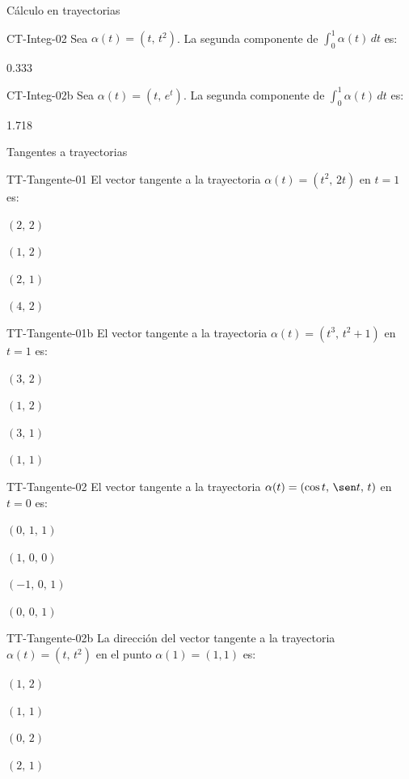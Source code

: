 \documentclass[a4,11pt]{aleph-notas}
\begin{document}
\begin{quiz}{Cálculo en trayectorias}
\begin{numerical}[tolerance=0.01]%
    {CT-Integ-02}
    Sea $\alpha(t)=(t,\, t^2)$. La segunda componente de $\displaystyle\int_0^1 \alpha(t)\,dt$ es:
    \item 0.333
\end{numerical}

\begin{numerical}[tolerance=0.01]%
    {CT-Integ-02b}
    Sea $\alpha(t)=(t,\, e^t)$. La segunda componente de $\displaystyle\int_0^1 \alpha(t)\,dt$ es:
    \item 1.718
\end{numerical}

\end{quiz}


\begin{quiz}{Tangentes a trayectorias}

\begin{multi}[]%
    {TT-Tangente-01}
    El vector tangente a la trayectoria $\alpha(t)=(t^2,\, 2t)$ en $t=1$ es:
    \item* $(2,\, 2)$
    \item $(1,\, 2)$
    \item $(2,\, 1)$
    \item $(4,\, 2)$
\end{multi}

\begin{multi}[]%
    {TT-Tangente-01b}
    El vector tangente a la trayectoria $\alpha(t)=(t^3,\, t^2+1)$ en $t=1$ es:
    \item* $(3,\, 2)$
    \item $(1,\, 2)$
    \item $(3,\, 1)$
    \item $(1,\, 1)$
\end{multi}

\begin{multi}[]%
    {TT-Tangente-02}
    El vector tangente a la trayectoria $\alpha(t)=(\cos t,\, \sen t,\, t)$ en $t=0$ es:
    \item* $(0,\, 1,\, 1)$
    \item $(1,\, 0,\, 0)$
    \item $(-1,\, 0,\, 1)$
    \item $(0,\, 0,\, 1)$
\end{multi}

\begin{multi}[]%
    {TT-Tangente-02b}
    La dirección del vector tangente a la trayectoria $\alpha(t)=(t,\, t^2)$ en el punto $\alpha(1)=(1,1)$ es:
    \item* $(1,\, 2)$
    \item $(1,\, 1)$
    \item $(0,\, 2)$
    \item $(2,\, 1)$
\end{multi}


\end{quiz}
\end{document}
